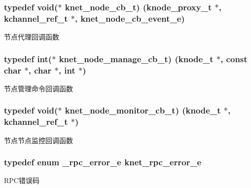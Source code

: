 \subsubsection[{knet\+\_\+node\+\_\+cb\+\_\+t}]{\setlength{\rightskip}{0pt plus 5cm}typedef void($\ast$ knet\+\_\+node\+\_\+cb\+\_\+t) ({\bf knode\+\_\+proxy\+\_\+t} $\ast$, {\bf kchannel\+\_\+ref\+\_\+t} $\ast$, {\bf knet\+\_\+node\+\_\+cb\+\_\+event\+\_\+e})}\label{a00066_a09c2d1f8eef7dc82226691ce39b7c4d8_a09c2d1f8eef7dc82226691ce39b7c4d8}
节点代理回调函数 \hypertarget{a00066_acd4bad75f444cb56dffa5f9413bbe456_acd4bad75f444cb56dffa5f9413bbe456}{}
\subsubsection[{knet\+\_\+node\+\_\+manage\+\_\+cb\+\_\+t}]{\setlength{\rightskip}{0pt plus 5cm}typedef int($\ast$ knet\+\_\+node\+\_\+manage\+\_\+cb\+\_\+t) ({\bf knode\+\_\+t} $\ast$, const char $\ast$, char $\ast$, int $\ast$)}\label{a00066_acd4bad75f444cb56dffa5f9413bbe456_acd4bad75f444cb56dffa5f9413bbe456}
节点管理命令回调函数 \hypertarget{a00066_aabd13837697aceb20b2a2cb8908e79cd_aabd13837697aceb20b2a2cb8908e79cd}{}
\subsubsection[{knet\+\_\+node\+\_\+monitor\+\_\+cb\+\_\+t}]{\setlength{\rightskip}{0pt plus 5cm}typedef void($\ast$ knet\+\_\+node\+\_\+monitor\+\_\+cb\+\_\+t) ({\bf knode\+\_\+t} $\ast$, {\bf kchannel\+\_\+ref\+\_\+t} $\ast$)}\label{a00066_aabd13837697aceb20b2a2cb8908e79cd_aabd13837697aceb20b2a2cb8908e79cd}
节点节点监控回调函数 \hypertarget{a00066_a09f6be2164ffa374198a4ab2af2e1966_a09f6be2164ffa374198a4ab2af2e1966}{}
\subsubsection[{knet\+\_\+rpc\+\_\+error\+\_\+e}]{\setlength{\rightskip}{0pt plus 5cm}typedef enum {\bf \+\_\+rpc\+\_\+error\+\_\+e}  {\bf knet\+\_\+rpc\+\_\+error\+\_\+e}}\label{a00066_a09f6be2164ffa374198a4ab2af2e1966_a09f6be2164ffa374198a4ab2af2e1966}
R\+P\+C错误码 \hypertarget{a00066_a6fe1ebc0ddea56dd3c337115c1e10bc4_a6fe1ebc0ddea56dd3c337115c1e10bc4}{}
